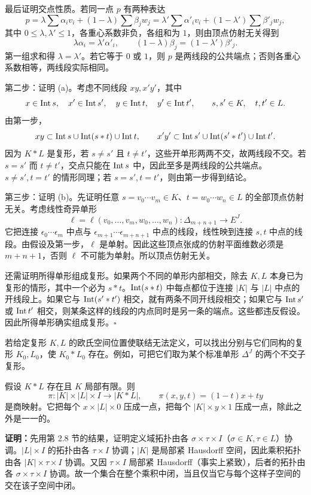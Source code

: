 最后证明交点性质。若同一点 $p$ 有两种表达
\[
p=\lambda\sum\alpha_iv_i+(1-\lambda)\sum\beta_jw_j
=\lambda'\sum\alpha'_iv_i+(1-\lambda')\sum\beta'_jw_j,
\]
其中 $0\le\lambda,\lambda'\le1$，各重心系数非负，各组和为 $1$，则由顶点仿射无关得到
\[\lambda\alpha_i=\lambda'\alpha'_i,\qquad
(1-\lambda)\beta_j=(1-\lambda')\beta'_j.\]
第一组求和得 $\lambda=\lambda'$。若它等于 $0$ 或 $1$，则 $p$ 是两线段的公共端点；否则各重心系数相等，两线段实际相同。

第二步：证明 (a)。考虑不同线段 $xy,x'y'$，其中
\[x\in\operatorname{Int} s,\quad x'\in\operatorname{Int} s',\quad y\in\operatorname{Int} t,\quad y'\in\operatorname{Int} t',
\qquad s,s'\in K,\quad t,t'\in L.\]
由第一步，
\[xy\subset\operatorname{Int} s\cup\operatorname{Int}(s*t)\cup\operatorname{Int} t,\qquad
x'y'\subset\operatorname{Int} s'\cup\operatorname{Int}(s'*t')\cup\operatorname{Int} t'.\]
因为 $K*L$ 是复形，若 $s\ne s'$ 且 $t\ne t'$，这些开单形两两不交，故两线段不交。若 $s=s'$ 而 $t\ne t'$，交点只能在 $\operatorname{Int} s$ 中，因此至多是两线段的公共端点。$s\ne s',t=t'$ 的情形同理；若 $s=s',t=t'$，则由第一步得到结论。

第三步：证明 (b)。先证明任意 $s=v_0\cdots v_m\in K$、$t=w_0\cdots w_n\in L$ 的全部顶点仿射无关。考虑线性奇异单形
\[\ell=\ell(v_0,\ldots,v_m,w_0,\ldots,w_n):\Delta_{m+n+1}\to E^J.\]
它把连接 $\epsilon_0\cdots\epsilon_m$ 中点与 $\epsilon_{m+1}\cdots\epsilon_{m+n+1}$ 中点的线段，线性映到连接 $s,t$ 中点的线段。由假设及第一步，$\ell$ 是单射。因此这些顶点张成的仿射平面维数必须是 $m+n+1$，否则 $\ell$ 不可能为单射。所以顶点仿射无关。

还需证明所得单形组成复形。如果两个不同的单形内部相交，除去 $K,L$ 本身已为复形的情形，其中一个必为 $s*t$。$\operatorname{Int}(s*t)$ 中每点都位于连接 $|K|$ 与 $|L|$ 中点的开线段上。如果它与 $\operatorname{Int}(s'*t')$ 相交，就有两条不同开线段相交；如果它与 $\operatorname{Int} s'$ 或 $\operatorname{Int} t'$ 相交，则某条这样的线段的内点同时是另一条的端点。这些都违反假设。因此所得单形确实组成复形。\hfill$\square$

若给定复形 $K,L$ 的欧氏空间位置使联结无法定义，可以找出分别与它们同构的复形 $K_0,L_0$，使 $K_0*L_0$ 存在。例如，可把它们取为某个标准单形 $\Delta^J$ 的两个不交子复形。

假设 $K*L$ 存在且 $K$ 局部有限。则
\[
\pi:|K|\times|L|\times I\to|K*L|,\qquad
\pi(x,y,t)=(1-t)x+ty
\]
是商映射。它把每个 $x\times|L|\times0$ 压成一点，把每个 $|K|\times y\times1$ 压成一点，除此之外是一一的。

\textbf{证明：}先用第 2.8 节的结果，证明定义域拓扑由各 $\sigma\times\tau\times I$（$\sigma\in K,\tau\in L$）协调。$|L|\times I$ 的拓扑由各 $\tau\times I$ 协调；$|K|$ 是局部紧 Hausdorff 空间，因此乘积拓扑由各 $|K|\times\tau\times I$ 协调。又因 $\tau\times I$ 局部紧 Hausdorff（事实上紧致），后者的拓扑由各 $\sigma\times\tau\times I$ 协调。故一个集合在整个乘积中闭，当且仅当它与每个这样子空间的交在该子空间中闭。

